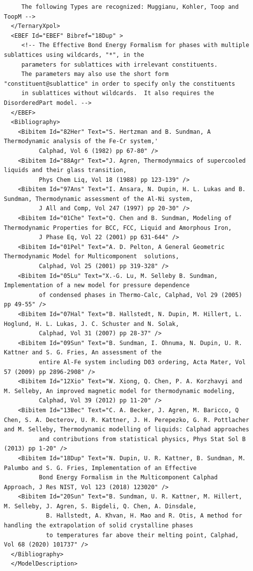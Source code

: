 \documentclass{article}
\begin{document}
\begin{appendices}
{\begin{verbatim}
     The following Types are recognized: Muggianu, Kohler, Toop and ToopM -->
  </TernaryXpol>
  <EBEF Id="EBEF" Bibref="18Dup" > 
     <!-- The Effective Bond Energy Formalism for phases with multiple sublattices using wildcards, "*", in the
     parameters for sublattices with irrelevant constituents.
     The parameters may also use the short form "constituent@sublattice" in order to specify only the constituents
     in sublattices without wildcards.  It also requires the DisorderedPart model. -->
  </EBEF>
  <Bibliography> 
    <Bibitem Id="82Her" Text="S. Hertzman and B. Sundman, A Thermodynamic analysis of the Fe-Cr system,'
          Calphad, Vol 6 (1982) pp 67-80" />
    <Bibitem Id="88Agr" Text="J. Agren, Thermodynmaics of supercooled liquids and their glass transition,
          Phys Chem Liq, Vol 18 (1988) pp 123-139" />
    <Bibitem Id="97Ans" Text="I. Ansara, N. Dupin, H. L. Lukas and B. Sundman, Thermodynamic assessment of the Al-Ni system,
          J All and Comp, Vol 247 (1997) pp 20-30" />
    <Bibitem Id="01Che" Text="Q. Chen and B. Sundman, Modeling of Thermodynamic Properties for BCC, FCC, Liquid and Amorphous Iron,
          J Phase Eq, Vol 22 (2001) pp 631-644" />
    <Bibitem Id="01Pel" Text="A. D. Pelton, A General Geometric Thermodynamic Model for Multicomponent  solutions,
          Calphad, Vol 25 (2001) pp 319-328" />
    <Bibitem Id="05Lu" Text="X.-G. Lu, M. Selleby B. Sundman, Implementation of a new model for pressure dependence
          of condensed phases in Thermo-Calc, Calphad, Vol 29 (2005) pp 49-55" />
    <Bibitem Id="07Hal" Text="B. Hallstedt, N. Dupin, M. Hillert, L. Hoglund, H. L. Lukas, J. C. Schuster and N. Solak,
          Calphad, Vol 31 (2007) pp 28-37" />
    <Bibitem Id="09Sun" Text="B. Sundman, I. Ohnuma, N. Dupin, U. R. Kattner and S. G. Fries, An assessment of the
          entire Al-Fe system including D03 ordering, Acta Mater, Vol 57 (2009) pp 2896-2908" />
    <Bibitem Id="12Xio" Text="W. Xiong, Q. Chen, P. A. Korzhavyi and M. Selleby, An improved magnetic model for thermodynamic modeling,
          Calphad, Vol 39 (2012) pp 11-20" />
    <Bibitem Id="13Bec" Text="C. A. Becker, J. Agren, M. Baricco, Q Chen, S. A. Decterov, U. R. Kattner, J. H. Perepezko, G. R. Pottlacher and M. Selleby, Thermodynamic modelling of liquids: Calphad approaches
          and contributions from statistical physics, Phys Stat Sol B (2013) pp 1-20" />
    <Bibitem Id="18Dup" Text="N. Dupin, U. R. Kattner, B. Sundman, M. Palumbo and S. G. Fries, Implementation of an Effective
          Bond Energy Formalism in the Multicomponent Calphad Approach, J Res NIST, Vol 123 (2018) 123020" />
    <Bibitem Id="20Sun" Text="B. Sundman, U. R. Kattner, M. Hillert, M. Selleby, J. Agren, S. Bigdeli, Q. Chen, A. Dinsdale,
            B. Hallstedt, A. Khvan, H. Mao and R. Otis, A method for handling the extrapolation of solid crystalline phases
            to temperatures far above their melting point, Calphad, Vol 68 (2020) 101737" />
  </Bibliography>
  </ModelDescription>


\end{verbatim}}
\end{appendices}
\end{document}
